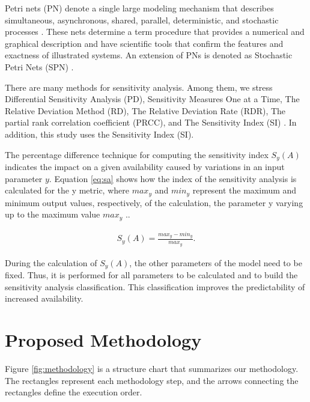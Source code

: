 \documentclass[conference]{IEEEtran}
\begin{document}
Petri nets (PN) denote a single large modeling mechanism that describes simultaneous, asynchronous, shared, parallel, deterministic, and stochastic processes \citep{Murata}. These nets determine a term procedure that provides a numerical and graphical description and have scientific tools that confirm the features and exactness of illustrated systems. An extension of PNs is denoted as Stochastic Petri Nets (SPN) \citep{marsan1998modelling} \citep{german2000performance} \citep{maciel_2023_vol1} \citep{molloy1982integration}.

There are many methods for sensitivity analysis. Among them, we stress Differential Sensitivity Analysis (PD), Sensitivity Measures One at a Time, The Relative Deviation Method (RD), The Relative Deviation Rate (RDR), The partial rank correlation coefficient (PRCC), and The Sensitivity Index (SI) \citep{hamby1995comparison}. In addition, this study uses the Sensitivity Index (SI).

The percentage difference technique for computing the sensitivity index $S_y(A)$ indicates the impact on a given availability caused by variations in an input parameter $y$. Equation \ref{eq:sa} shows how the index of the sensitivity analysis is calculated for the y metric, where $max_y$ and $min_y$ represent the maximum and minimum output values, respectively, of the calculation, the parameter y varying up to the maximum value $max_y$ \citep{clemente2022availability}.. 

\begin{align}
\label{eq:sa}
S_y(A) = \frac{max_y - min_y}{max_y}.
\end{align}

During the calculation of $S_y(A)$, the other parameters of the model need to be fixed. Thus, it is performed for all parameters to be calculated and to build the sensitivity analysis classification. This classification improves the predictability of increased availability.

\section{Proposed Methodology}
\label{sec:methodology}

Figure \ref{fig:methodology} is a structure chart that summarizes our methodology. The rectangles represent each methodology step, and the arrows connecting the rectangles define the execution order. 
\end{document}
